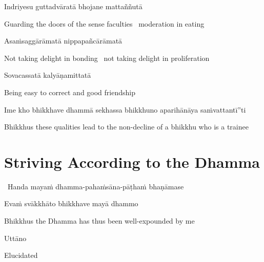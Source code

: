 Indriyesu guttadvāratā bhojane mattaññutā

\begin{english}
  Guarding the doors of the sense faculties \breathmark\ moderation in eating
\end{english}

Asaṁsaggārāmatā nippapañcārāmatā

\begin{english}
  Not taking delight in bonding \breathmark\ not taking delight in proliferation
\end{english}

Sovacassatā kalyāṇamittatā

\begin{english}
  Being easy to correct and good friendship
\end{english}

\begin{pali-hang}
  Ime kho bhikkhave dhammā sekhassa bhikkhuno aparihānāya saṁvattantī''ti
\end{pali-hang}

\begin{english-hang}
  Bhikkhus these qualities lead to the non-decline of a bhikkhu who is a trainee
\end{english-hang}

\suttaRef{[AN 6.22 \& AN 8.79]}


\section{Striving According to the Dhamma}
\label{striving-according-to-dhamma}

\begin{leader}
  \anglebracketleft\ \hspace{-0.5mm}Handa mayaṁ dhamma-pahaṁsāna-pāṭhaṁ bhaṇāmase \hspace{-0.5mm}\anglebracketright\
\end{leader}

Evaṁ svākkhāto bhikkhave mayā dhammo

\begin{english}
  Bhikkhus the Dhamma has thus been well-expounded by me
\end{english}

Uttāno

\begin{english}
  Elucidated
\end{english}

